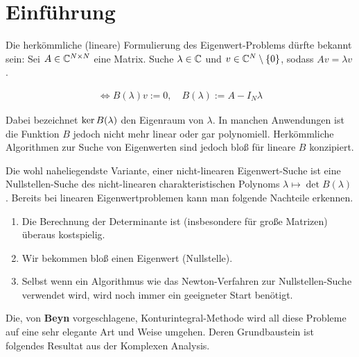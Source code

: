 \section{Einführung}

Die herkömmliche (lineare) Formulierung des Eigenwert-Problems dürfte bekannt sein:
Sei $A \in \mathbb{C}^{N \times N}$ eine Matrix.
Suche $\lambda \in \mathbb{C}$ und $v \in \mathbb{C}^N \setminus {\left \{ 0 \right \}}$, sodass $A v = \lambda v$.

\begin{align*}
    \iff
    B(\lambda) v := 0,
    \quad
    B(\lambda) := A - I_N \lambda
\end{align*}

Dabei bezeichnet $\operatorname{ker} B(\lambda)$ den Eigenraum von $\lambda$.
In manchen Anwendungen ist die Funktion $B$ jedoch nicht mehr linear oder gar polynomiell.
Herkömmliche Algorithmen zur Suche von Eigenwerten sind jedoch bloß für lineare $B$ konzipiert.

Die wohl naheliegendste Variante, einer nicht-linearen Eigenwert-Suche ist eine Nullstellen-Suche des nicht-linearen charakteristischen Polynoms $\lambda \mapsto \det B(\lambda)$.
Bereits bei linearen Eigenwertproblemen kann man folgende Nachteile erkennen.

\begin{enumerate}[label = \arabic*.]
    \item Die Berechnung der Determinante ist (insbesondere für große Matrizen) überaus kostspielig.
    \item Wir bekommen bloß einen Eigenwert (Nullstelle).
    \item Selbst wenn ein Algorithmus wie das Newton-Verfahren zur Nullstellen-Suche verwendet wird, wird noch immer ein geeigneter Start benötigt.
\end{enumerate}

Die, von \textbf{Beyn} vorgeschlagene, Konturintegral-Methode wird all diese Probleme auf eine sehr elegante Art und Weise umgehen.
Deren Grundbaustein ist folgendes Resultat aus der Komplexen Analysis.